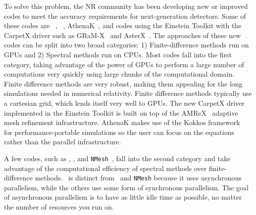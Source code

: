 \begin{bibunit}[unsrtnat]
To solve this problem, the NR community has been developing new or
improved codes to meet
the accuracy requirements for next-generation detectors. Some of these codes are
\spec~\cite{SpECwebsite}, \spectre~\cite{spectrecode_2025},
AthenaK~\cite{Zhu:2024utz}, and codes using the Einstein Toolkit with the
CarpetX driver such as GRaM-X~\cite{Shankar:2022ful} and
AsterX~\cite{Kalinani:2024rbk}. The approaches of these new codes can be split
into two broad categories: 1) Finite-difference methods run on GPUs and 2)
Spectral methods run on CPUs. Most codes fall into the first category, taking
advantage of the power of GPUs to perform a large number of computations very
quickly using large chunks of the computational domain. Finite difference
methods are very robust, making them appealing for the long simulations needed
in numerical relativity. Finite difference methods typically use a
cartesian grid, which lends itself very well to GPUs. The new
CarpetX driver implemented in the Einstein Toolkit is built on top of the
AMReX~\cite{amrex} adaptive mesh refinement infrastructure. AthenaK makes use of
the Kokkos framework~\cite{kokkos} for performance-portable simulations so the
user can focus on the equations rather than the parallel infrastructure.

A few codes, such as \spectre, \spec, and \texttt{NMesh}~\cite{Tichy:2022hpa},
fall into the second category and take advantage of the computational efficiency
of spectral methods over finite-difference methods. \spectre~is distinct from
\spec~and \texttt{NMesh} because it uses asynchronous parallelism, while the
others use some form of synchronous parallelism. The goal of asynchronous
parallelism is to have as little
idle time as possible, no matter the number of resources you run on.



\end{bibunit}
